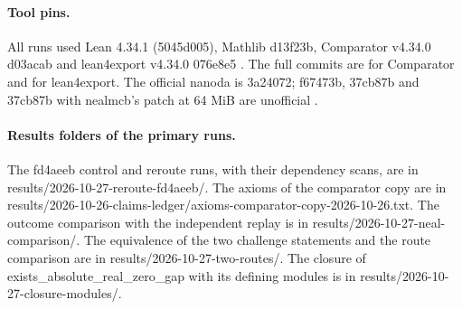 \paragraph{Tool pins.}
All runs used Lean 4.34.1 (5045d005), Mathlib d13f23b, Comparator v4.34.0 d03acab and lean4export v4.34.0 076e8e5 \cite{lean4,mathlib,comparator,lean4export}.
The full commits are  for Comparator and  for lean4export.
The official nanoda is 3a24072; f67473b, 37cb87b and 37cb87b with nealmcb's patch at 64 MiB are unofficial \cite{nanoda-lib}.

\paragraph{Results folders of the primary runs.}
The fd4aeeb control and reroute runs, with their dependency scans, are in results/2026-10-27-reroute-fd4aeeb/.
The axioms of the comparator copy are in results/2026-10-26-claims-ledger/axioms-comparator-copy-2026-10-26.txt.
The outcome comparison with the independent replay is in results/2026-10-27-neal-comparison/.
The equivalence of the two challenge statements and the route comparison are in results/2026-10-27-two-routes/.
The closure of exists\_absolute\_real\_zero\_gap with its defining modules is in results/2026-10-27-closure-modules/.
